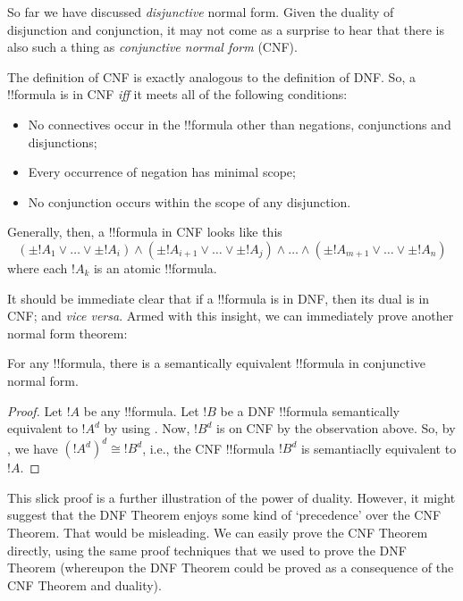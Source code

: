 \documentclass[../../../include/open-logic-section]{subfiles}
\begin{document}
So far we have discussed \emph{disjunctive} normal form. Given the duality of disjunction and conjunction, it may not come as a surprise to hear that there is also such a thing as \emph{conjunctive normal form} (CNF).

The definition of CNF is exactly analogous to the definition of DNF. So, a !!{formula} is in CNF \emph{iff} it meets all of the following conditions:
	\begin{itemize}
		\item No connectives occur in the !!{formula} other than negations, conjunctions and disjunctions;
		\item Every occurrence of negation has minimal scope;
		\item No conjunction occurs within the scope of any disjunction. 
	\end{itemize}
Generally, then, a !!{formula} in CNF looks like this
	$$(\pm {!A}_1 \lor \ldots \lor \pm {!A}_i) \land (\pm {!A}_{i+1} \lor \ldots \lor \pm{!A}_j) \land \ldots \land (\pm{!A}_{m+1} \lor\ldots \lor \pm {!A}_n)$$
where each ${!A}_k$ is an atomic !!{formula}.

It should be immediate clear that if a !!{formula} is in DNF, then its dual is in CNF; and \emph{vice versa}. Armed with this insight, we can immediately prove another normal form theorem:
	\begin{prop} For any !!{formula}, there is a semantically equivalent !!{formula} in conjunctive normal form.
	\end{prop}
\begin{proof}
	Let $!A$ be any !!{formula}. Let $!B$ be a DNF !!{formula} semantically equivalent to $!A^d$ by using . Now, $!B^d$ is on CNF by the observation above. So, by , we have $(!A^d)^d \cong !B^d$, i.e., the CNF !!{formula} $!B^d$ is semantiaclly equivalent to $!A$.
\end{proof}

This slick proof is a further illustration of the power of duality. However, it might suggest that the DNF Theorem enjoys some kind of `precedence' over the CNF Theorem. That would be misleading.  We can easily prove the CNF Theorem directly, using the same proof techniques that we used to prove the DNF Theorem (whereupon the DNF Theorem could be proved as a consequence of the CNF Theorem and duality). 
\end{document}
